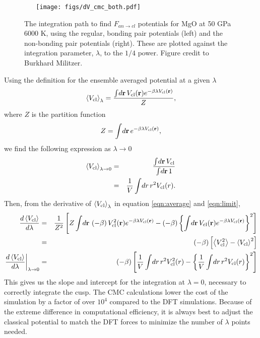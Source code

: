 \begin{figure}[h!]  
  \centering
  \texttt{[image: figs/dV\_cmc\_both.pdf]}
\caption{The integration path to find $F_{an \to cl}$ potentials for MgO at 50 GPa 6000
K, using the regular, bonding pair potentials (left) and
the non-bonding pair potentials (right). These are plotted against the
integration parameter, $\lambda$, to the $1/4$ power. Figure credit to Burkhard
Militzer. }
\label{fig:integrate_cmc}
\end{figure}

Using the definition for the ensemble averaged potential at a given
$\lambda$
\begin{eqnarray}
  \left< V_{\rm cl} \right>_{\lambda} = \frac{ \int \! d{\bf r} \, V_{\rm cl}({\bf r}) 
  e^{ -\beta \lambda V_{\rm cl}({\bf r}) } }
  { Z}, \label{eqn:average}
\end{eqnarray}
where $Z$ is the partition function
\begin{eqnarray}
Z =  \int \! d{\bf r} \, e^{ -\beta \lambda V_{\rm cl}({\bf r}) },
\end{eqnarray}
%
we find the following expression as $\lambda \to 0$
%
\begin{eqnarray}
 \left< V_{\rm cl} \right>_{\lambda \to 0} &=& \frac{ \int \! d{\bf r} \, V_{\rm
 cl}}
 {  \int \! d{\bf r} \, 1} \nonumber \\
 &=& \frac{1}{V}  \int \! dr \, r^2 V_{\rm cl}(r). \label{eqn:limit}
\end{eqnarray}
%
Then, from the derivative of $\left< V_{\rm cl} \right>_{\lambda}$ in
equation \ref{eqn:average} and \ref{eqn:limit},
\begin{eqnarray}
  \frac{d \left< V_{\rm cl} \right>}{d \lambda}
   &=& \frac{1}{Z^2} 
  \left[ Z \int \! d{\bf r} \, \left(-\beta \right)V_{\rm cl}^2({\bf r}) 
    e^{ -\beta \lambda V_{\rm cl}({\bf r}) } 
   - \left(-\beta \right)\left\{  \int \! d{\bf r} \, V_{\rm cl}({\bf r}) e^{ -\beta \lambda
     V_{\rm cl}({\bf r}) } \right\}^2
    \right] \nonumber \\
   &=& (-\beta) \left[ \left< V_{\rm cl}^2 \right> - \left< V_{\rm
   cl}\right>^2 \right] \nonumber \\
   \left. \frac{d \left< V_{\rm cl} \right>}{d \lambda}\right|_{\lambda \to 0} 
   &=& (-\beta) \left[  \frac{1}{V}  \int \! dr \, r^2 V^2_{\rm cl}(r) -
     \left\{ \frac{1}{V}  \int \! dr \, r^2 V_{\rm cl}(r) \right\}^2 \right]
  \end{eqnarray}
This gives us the slope and intercept for the integration at $\lambda=0$, necessary to
correctly integrate the cusp. The CMC calculations lower the cost of the simulation
by a factor of over $10^4$ compared to the DFT simulations. Because of the extreme
difference in computational efficiency, it is always best to adjust the classical
potential to match the DFT forces to minimize the number of $\lambda$ points needed.


